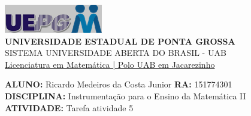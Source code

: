 \documentclass[a4paper, 12pt]{article}
\begin{document}
\begin{flushleft}\includegraphics{logo}\\
\textbf{UNIVERSIDADE ESTADUAL DE PONTA GROSSA} \\
SISTEMA UNIVERSIDADE ABERTA DO BRASIL - UAB \\
\underline{Licenciatura em Matemática | Polo UAB em Jacarezinho}\end{flushleft} 
\textbf{ALUNO:} Ricardo Medeiros da Costa Junior   \textbf{RA:} 151774301 \\
\textbf{DISCIPLINA:} Instrumentação para o Ensino da Matemática II \\
\textbf{ATIVIDADE:} Tarefa atividade 5  \\
\end{document}
